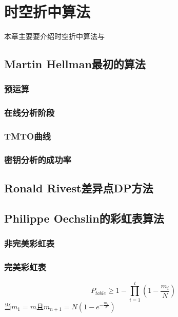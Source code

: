 \chapter{时空折中算法}
本章主要要介绍时空折中算法与
\section{Martin Hellman最初的算法}
	\subsection{预运算}
	\subsection{在线分析阶段}
	\subsection{TMTO曲线}
	\subsection{密钥分析的成功率}
\section{Ronald Rivest差异点DP方法}
\section{Philippe Oechslin的彩虹表算法}
	\subsection{非完美彩虹表}
	\subsection{完美彩虹表}
\begin{equation}
P_{table} \ge 1-\prod^{t}_{i=1}(1-\frac{m_{i}}{N})
\end{equation}
当$m_{1}=m$且$m_{n+1} = N(1-e^{-\tfrac{m_{n}}{N}})$
